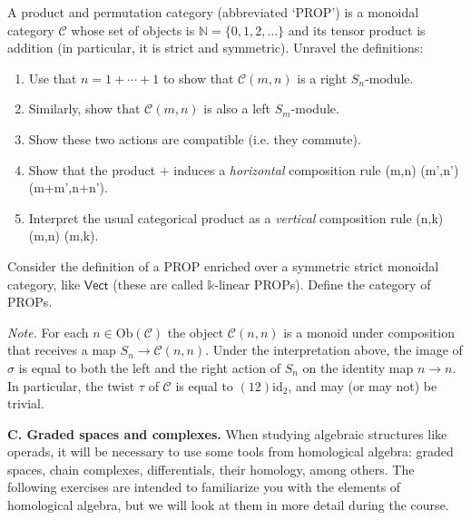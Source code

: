 \documentclass[fleqn, a4paper, twoside]{article}
\makeatletter
\newcommand{\0}{\langle 0\rangle}
\newenvironment{tenumerate}{
 \begin{enumerate}
  \setlength{\itemsep}{0pt}
  \setlength{\parskip}{0pt}
}{\end{enumerate}}
\let\[\@undefined
\DeclareRobustCommand{\[}{\begin{equation}}%
\let\]\@undefined
\DeclareRobustCommand{\]}{\end{equation}}%
\theoremstyle{mytheorem}
\theoremstyle{introthm}
\theoremstyle{mydefinition}
\theoremstyle{mydefinition2}
\theoremstyle{plain} %
\newcommand{\?}{\,?\,}
\theoremstyle{mytheorem}
\theoremstyle{plain} %
\makeatother
\begin{document}
\begin{question} A product and permutation category (abbreviated `PROP')
is a monoidal category $\mathcal{C}$ whose set of objects is $\mathbb N = 
\{0,1,2,\ldots\}$ and its tensor product is addition (in particular, it is strict and symmetric). Unravel the definitions:
\begin{tenumerate}
\item Use that $n = 1+\cdots + 1$ to show that $\mathcal{C}(m,n)$ is a right $S_n$-module.
\item Similarly, show that $\mathcal{C}(m,n)$ is also a left $S_m$-module.
\item Show these two actions are compatible (i.e. they commute).
\item Show that the product $+$ induces a \emph{horizontal} composition rule 
\[ (m,n) \times {}(m',n') 	\longrightarrow
 	(m+m',n+n'). \]
\item Interpret the usual categorical product as a \emph{vertical} composition rule 
\[ (n,k) \times {}(m,n) 	\longrightarrow
 	(m,k). \]
\end{tenumerate}
Consider the definition of a PROP enriched over a symmetric strict 
monoidal category, like $\mathsf{Vect}$ (these are called $\mathbb{k}$-linear
PROPs). Define the category of PROPs. 
\end{question}

\emph{Note.} For 
each $n\in\mathrm{Ob}(\mathcal C)$ the
object $\mathcal{C}(n,n)$ is a monoid under composition
 that receives a map $S_n\longrightarrow \mathcal{C}(n,n)$.
 Under the interpretation above, the image of $\sigma$
  is equal to both the left and the right action of $S_n$ 
  on the identity map $n\to n$. In particular, the twist
  $\tau$ of $\mathcal{C}$ is equal to $(12)\mathrm{id}_2$,
  and may (or may not) be trivial.
  
  \medskip
  
\textbf{C. Graded spaces and complexes.} When studying
algebraic structures like operads, it will be necessary
to use some tools from homological algebra: graded spaces,
chain complexes, differentials, their homology, among
others. The following exercises are intended to familiarize
you with the elements of homological algebra, but we will
look at them in more detail during the course.
\end{document}
